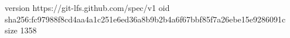 version https://git-lfs.github.com/spec/v1
oid sha256:fc97988f8cd4aa4a1c251e6ed36a8b9b2b4a6f67bbf85f7a26ebe15e9286091c
size 1358
